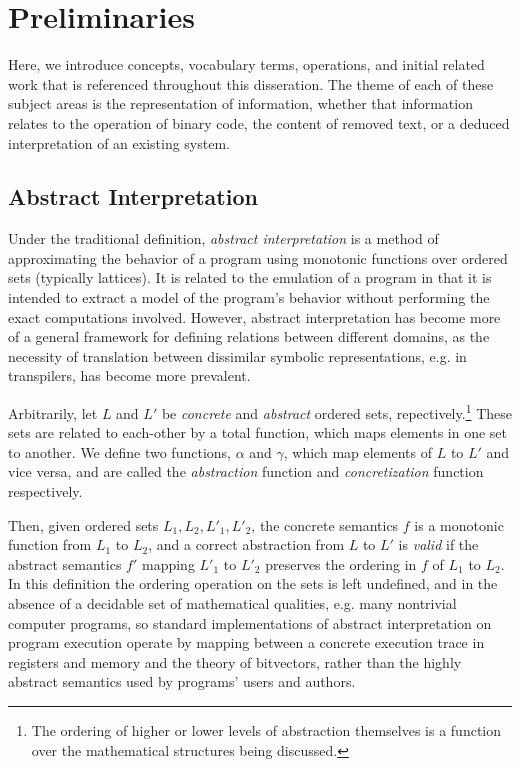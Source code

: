 \chapter{Preliminaries}
\label{chap:prelim}

Here, we introduce concepts, vocabulary terms, operations, and initial related work that is referenced throughout this disseration.
The theme of each of these subject areas is the representation of information, whether that information relates to the operation of binary code, the content of removed text, or a deduced interpretation of an existing system.

\section{Abstract Interpretation}

Under the traditional definition, \emph{abstract interpretation} is a method of approximating the behavior of a program using monotonic functions over ordered sets (typically lattices).
It is related to the emulation of a program in that it is intended to extract a model of the program's behavior without performing the exact computations involved.
However, abstract interpretation has become more of a general framework for defining relations between different domains, as the necessity of translation between dissimilar symbolic representations, e.g. in transpilers, has become more prevalent.

Arbitrarily, let $L$ and $L'$ be \emph{concrete} and \emph{abstract} ordered sets, repectively.\footnote{The ordering of higher or lower levels of abstraction themselves is a function over the mathematical structures being discussed.}
These sets are related to each-other by a total function, which maps elements in one set to another.
We define two functions, $\alpha$ and $\gamma$, which map elements of $L$ to $L'$ and vice versa, and are called the \emph{abstraction} function and \emph{concretization} function respectively.

Then, given ordered sets $L_{1}, L_{2}, L'_{1}, L'_{2}$, the concrete semantics $f$ is a monotonic function from $L_{1}$ to $L_{2}$, and a correct abstraction from $L$ to $L'$ is \emph{valid} if the abstract semantics $f'$ mapping $L'_{1}$ to $L'_{2}$ preserves the ordering in $f$ of $L_{1}$ to $L_{2}$.
In this definition the ordering operation on the sets is left undefined, and in the absence of a decidable set of mathematical qualities, e.g. many nontrivial computer programs, so standard implementations of abstract interpretation on program execution operate by mapping between a concrete execution trace in registers and memory and the theory of bitvectors, rather than the highly abstract semantics used by programs' users and authors.

